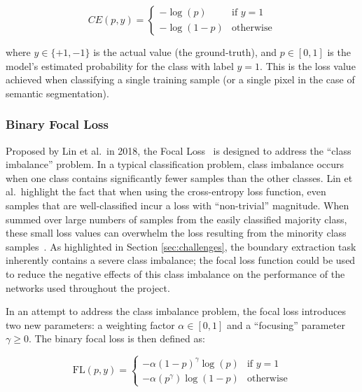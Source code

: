 \begin{equation}
    CE(p, y) = 
    \begin{cases}
        -\log(p) & \text{if } y = 1\\
        -\log(1 - p) & \text{otherwise}
    \end{cases}
\end{equation}

where $y \in \{+1, -1\}$ is the actual value (the ground-truth), and $p \in [0, 1]$ is the model's estimated probability for the class with label $y = 1$. This is the loss value achieved when classifying a single training sample (or a single pixel in the case of semantic segmentation).

\subsubsection{Binary Focal Loss}

Proposed by Lin et al.\ in 2018, the Focal Loss~\cite{focalloss} is designed to address the ``class imbalance'' problem. In a typical classification problem, class imbalance occurs when one class contains significantly fewer samples than the other classes. Lin et al.\ highlight the fact that when using the cross-entropy loss function, even samples that are well-classified incur a loss with ``non-trivial'' magnitude. When summed over large numbers of samples from the easily classified majority class, these small loss values can overwhelm the loss resulting from the minority class samples~\cite{focalloss}. As highlighted in Section \ref{sec:challenges}, the boundary extraction task inherently contains a severe class imbalance; the focal loss function could be used to reduce the negative effects of this class imbalance on the performance of the networks used throughout the project.

In an attempt to address the class imbalance problem, the focal loss introduces two new parameters: a weighting factor $\alpha \in [0, 1]$ and a ``focusing'' parameter $\gamma \geq 0$.
The binary focal loss is then defined as:

\begin{equation}
    \text{FL}(p, y) = 
    \begin{cases}
        -\alpha(1 - p)^{\gamma} \log (p) & \text{if } y = 1\\
        -\alpha(p^{\gamma}) \log (1 - p) & \text{otherwise}
    \end{cases}
\end{equation}

